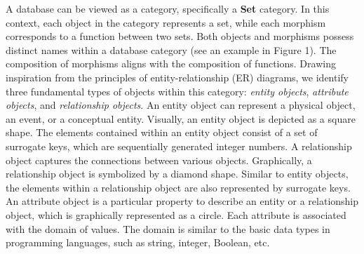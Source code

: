 



A database can be viewed as a category, specifically a \textbf{Set} category. In this context, each object in the category represents a set, while each morphism corresponds to a function between two sets. Both objects and morphisms possess distinct names within a database category (see an example in Figure 1). The composition of morphisms aligns with the composition of functions. Drawing inspiration from the principles of entity-relationship (ER) diagrams, we identify three fundamental types of objects within this category: \textit{entity objects}, \textit{attribute objects}, and \textit{relationship objects}. An entity object can represent a physical object, an event, or a conceptual entity. Visually, an entity object is depicted as a square shape. The elements contained within an entity object consist of a set of surrogate keys, which are sequentially generated integer numbers.  A relationship object captures the connections between various objects. Graphically, a relationship object is symbolized by a diamond shape. Similar to entity objects, the elements within a relationship object are also represented by surrogate keys.  An attribute object is a particular property to describe an entity or a relationship object, which is graphically represented as a circle.  Each attribute is associated with the domain of values. The domain is similar to the basic data types in programming languages, such as string, integer, Boolean, etc.  



